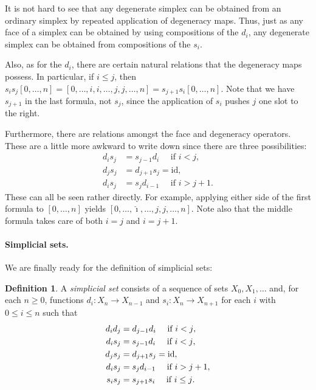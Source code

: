 \documentclass[12pt]{article}
\theoremstyle{plain}
\theoremstyle{definition}
\newtheorem{definition}[theorem]{Definition}
\begin{document}
It is not hard to see that any degenerate simplex can be obtained from an ordinary simplex by repeated application of degeneracy maps. Thus, just as any face of a simplex can be obtained by using compositions of the $d_i$,  any degenerate simplex can be obtained from compositions of the $s_i$. 

Also, as for the $d_i$, there are certain natural relations that the degeneracy maps possess. In particular, if $i\leq j$, then $s_is_j[0,\ldots,n]=[0,\ldots, i,i,\ldots, j,j,\ldots,n]=s_{j+1}s_i [0,\ldots,n]$. Note that we have $s_{j+1}$ in the last formula, not $s_j$, since the application of $s_i$ pushes $j$ one slot to the right. 

Furthermore, there are relations amongst the face and degeneracy operators. These are a little more awkward to write down since there are three possibilities: 
\begin{align*}
 d_i s_j &= s_{j-1} d_i\quad\text{ if $i < j$},\\
d_j s_j &= d_{j+1} s_j=\text{id},\\
 d_i s_j &= s_j d_{i-1}\quad  \text{ if $i > j + 1$}.
\end{align*}
These can all be seen rather directly. For example, applying either side of the first formula to $[0,\ldots,n]$ yields $[0,\ldots,\hat \imath,\ldots ,j,j,\ldots, n]$. Note also that the middle formula takes care of both $i=j$ and $i=j+1$. 

















\paragraph{Simplicial sets.}

We are finally ready for the definition of simplicial sets:
\begin{definition}\label{D: ss}
A \emph{simplicial set} consists of a sequence of sets $X_0, X_1, \ldots$ and, for each $n\geq 0$, functions $d_i\colon X_{n}\to X_{n-1}$ and $s_i\colon X_n\to X_{n+1}$ for each $i$ with $0\leq i\leq n$  such that 
\begin{align}
 d_id_j&=d_{j-1}d_i\quad \text{ if $i<j$}, \notag\\
 d_i s_j &= s_{j-1} d_i\quad\text{ if $i < j$},\notag \\
d_j s_j &= d_{j+1} s_j=\text{id},\label{E: axioms}\\
 d_i s_j &= s_j d_{i-1}\quad  \text{ if $i > j + 1$},\notag\\
  s_is_j&=s_{j+1}s_i\quad \text{ if $i\leq j$}.\notag
\end{align}
\end{definition}
\end{document}
